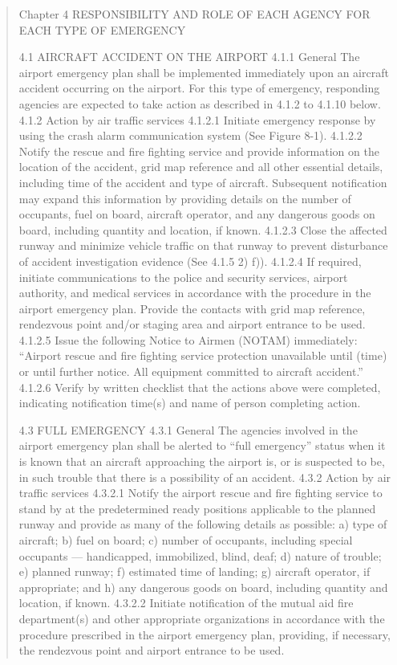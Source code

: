\begin{quotation}
Chapter 4
RESPONSIBILITY AND ROLE OF EACH AGENCY FOR EACH TYPE OF EMERGENCY

4.1 AIRCRAFT ACCIDENT ON THE AIRPORT
4.1.1 General
The airport emergency plan shall be implemented immediately upon an aircraft accident occurring on the airport. For this
type of emergency, responding agencies are expected to take action as described in 4.1.2 to 4.1.10 below.
4.1.2 Action by air traffic services
4.1.2.1 Initiate emergency response by using the crash alarm communication system (See Figure 8-1).
4.1.2.2 Notify the rescue and fire fighting service and provide information on the location of the accident, grid map
reference and all other essential details, including time of the accident and type of aircraft. Subsequent notification may
expand this information by providing details on the number of occupants, fuel on board, aircraft operator, and any
dangerous goods on board, including quantity and location, if known.
4.1.2.3 Close the affected runway and minimize vehicle traffic on that runway to prevent disturbance of accident
investigation evidence (See 4.1.5 2) f)).
4.1.2.4 If required, initiate communications to the police and security services, airport authority, and medical
services in accordance with the procedure in the airport emergency plan. Provide the contacts with grid map reference,
rendezvous point and/or staging area and airport entrance to be used.
4.1.2.5 Issue the following Notice to Airmen (NOTAM) immediately:
“Airport rescue and fire fighting service protection unavailable until (time) or until further notice. All equipment committed
to aircraft accident.”
4.1.2.6 Verify by written checklist that the actions above were completed, indicating notification time(s) and name
of person completing action.



4.3 FULL EMERGENCY
4.3.1 General
The agencies involved in the airport emergency plan shall be alerted to “full emergency” status when it is known that an
aircraft approaching the airport is, or is suspected to be, in such trouble that there is a possibility of an accident.
4.3.2 Action by air traffic services
4.3.2.1 Notify the airport rescue and fire fighting service to stand by at the predetermined ready positions
applicable to the planned runway and provide as many of the following details as possible:
a) type of aircraft;
b) fuel on board;
c) number of occupants, including special occupants — handicapped, immobilized, blind, deaf;
d) nature of trouble;
e) planned runway;
f) estimated time of landing;
g) aircraft operator, if appropriate; and
h) any dangerous goods on board, including quantity and location, if known.
4.3.2.2 Initiate notification of the mutual aid fire department(s) and other appropriate organizations in accordance
with the procedure prescribed in the airport emergency plan, providing, if necessary, the rendezvous point and airport
entrance to be used.




\end{quotation}
